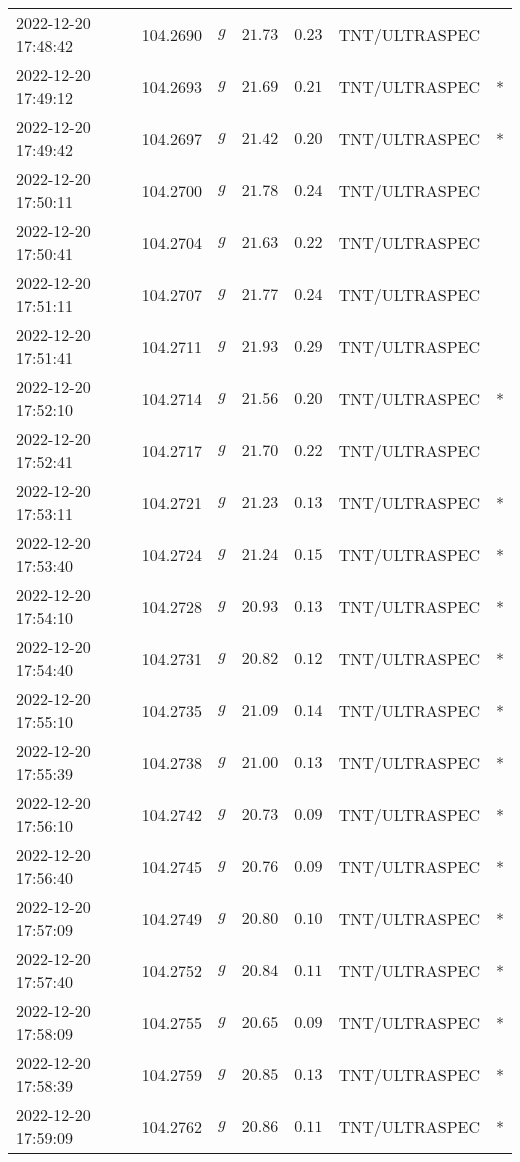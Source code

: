 \documentclass{nature_plusfigure}
\begin{document}
\begin{supplement}
\begin{center}
\begin{longtable}{lllllll}
2022-12-20 17:48:42 & 104.2690 & $g$ & $21.73$ & $0.23$ & TNT/ULTRASPEC &  \\ 
2022-12-20 17:49:12 & 104.2693 & $g$ & $21.69$ & $0.21$ & TNT/ULTRASPEC & * \\ 
2022-12-20 17:49:42 & 104.2697 & $g$ & $21.42$ & $0.20$ & TNT/ULTRASPEC & * \\ 
2022-12-20 17:50:11 & 104.2700 & $g$ & $21.78$ & $0.24$ & TNT/ULTRASPEC &  \\ 
2022-12-20 17:50:41 & 104.2704 & $g$ & $21.63$ & $0.22$ & TNT/ULTRASPEC &  \\ 
2022-12-20 17:51:11 & 104.2707 & $g$ & $21.77$ & $0.24$ & TNT/ULTRASPEC &  \\ 
2022-12-20 17:51:41 & 104.2711 & $g$ & $21.93$ & $0.29$ & TNT/ULTRASPEC &  \\ 
2022-12-20 17:52:10 & 104.2714 & $g$ & $21.56$ & $0.20$ & TNT/ULTRASPEC & * \\ 
2022-12-20 17:52:41 & 104.2717 & $g$ & $21.70$ & $0.22$ & TNT/ULTRASPEC &  \\ 
2022-12-20 17:53:11 & 104.2721 & $g$ & $21.23$ & $0.13$ & TNT/ULTRASPEC & * \\ 
2022-12-20 17:53:40 & 104.2724 & $g$ & $21.24$ & $0.15$ & TNT/ULTRASPEC & * \\ 
2022-12-20 17:54:10 & 104.2728 & $g$ & $20.93$ & $0.13$ & TNT/ULTRASPEC & * \\ 
2022-12-20 17:54:40 & 104.2731 & $g$ & $20.82$ & $0.12$ & TNT/ULTRASPEC & * \\ 
2022-12-20 17:55:10 & 104.2735 & $g$ & $21.09$ & $0.14$ & TNT/ULTRASPEC & * \\ 
2022-12-20 17:55:39 & 104.2738 & $g$ & $21.00$ & $0.13$ & TNT/ULTRASPEC & * \\ 
2022-12-20 17:56:10 & 104.2742 & $g$ & $20.73$ & $0.09$ & TNT/ULTRASPEC & * \\ 
2022-12-20 17:56:40 & 104.2745 & $g$ & $20.76$ & $0.09$ & TNT/ULTRASPEC & * \\ 
2022-12-20 17:57:09 & 104.2749 & $g$ & $20.80$ & $0.10$ & TNT/ULTRASPEC & * \\ 
2022-12-20 17:57:40 & 104.2752 & $g$ & $20.84$ & $0.11$ & TNT/ULTRASPEC & * \\ 
2022-12-20 17:58:09 & 104.2755 & $g$ & $20.65$ & $0.09$ & TNT/ULTRASPEC & * \\ 
2022-12-20 17:58:39 & 104.2759 & $g$ & $20.85$ & $0.13$ & TNT/ULTRASPEC & * \\ 
2022-12-20 17:59:09 & 104.2762 & $g$ & $20.86$ & $0.11$ & TNT/ULTRASPEC & * \\ 

\end{longtable}
\end{center}
\end{supplement}
\end{document}
